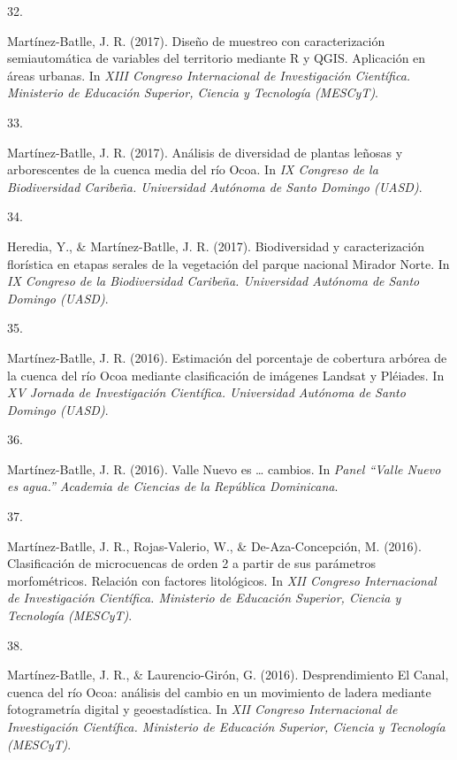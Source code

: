 \documentclass[10pt,a4paper,]{article}
\newlength{\cslhangindent}
\newlength{\csllabelwidth}
\newcommand{\CSLLeftMargin}[1]{\parbox[t]{\csllabelwidth}{\hfill #1~}}
\newcommand{\CSLRightInline}[1]{\parbox[t]{\linewidth - \cslhangindent - \csllabelwidth}{#1}\vspace{0.8ex}}
\begin{document}
\leavevmode\hypertarget{ref-Jose_Ramon_Martinez-Batlle_108008425}{}%
\CSLLeftMargin{32. }
\CSLRightInline{Martínez-Batlle, J. R. (2017). Diseño de muestreo con
caracterización semiautomática de variables del territorio mediante R y
QGIS. Aplicación en áreas urbanas. In \emph{XIII Congreso Internacional
de Investigación Científica. Ministerio de Educación Superior, Ciencia y
Tecnología (MESCyT)}.}

\leavevmode\hypertarget{ref-Jose_Ramon_Martinez-Batlle_108010451}{}%
\CSLLeftMargin{33. }
\CSLRightInline{Martínez-Batlle, J. R. (2017). Análisis de diversidad de
plantas leñosas y arborescentes de la cuenca media del río Ocoa. In
\emph{IX Congreso de la Biodiversidad Caribeña. Universidad Autónoma de
Santo Domingo (UASD)}.}

\leavevmode\hypertarget{ref-Jose_Ramon_Martinez-Batlle_108010431}{}%
\CSLLeftMargin{34. }
\CSLRightInline{Heredia, Y., \& Martínez-Batlle, J. R. (2017).
Biodiversidad y caracterización florística en etapas serales de la
vegetación del parque nacional Mirador Norte. In \emph{IX Congreso de la
Biodiversidad Caribeña. Universidad Autónoma de Santo Domingo (UASD)}.}

\leavevmode\hypertarget{ref-Jose_Ramon_Martinez-Batlle_108104972}{}%
\CSLLeftMargin{35. }
\CSLRightInline{Martínez-Batlle, J. R. (2016). Estimación del porcentaje
de cobertura arbórea de la cuenca del río Ocoa mediante clasificación de
imágenes Landsat y Pléiades. In \emph{XV Jornada de Investigación
Científica. Universidad Autónoma de Santo Domingo (UASD)}.}

\leavevmode\hypertarget{ref-Jose_Ramon_Martinez-Batlle_108095974}{}%
\CSLLeftMargin{36. }
\CSLRightInline{Martínez-Batlle, J. R. (2016). Valle Nuevo es \ldots{}
cambios. In \emph{Panel {``Valle Nuevo es agua.''} Academia de Ciencias
de la República Dominicana}.}

\leavevmode\hypertarget{ref-Jose_Ramon_Martinez-Batlle_108041435}{}%
\CSLLeftMargin{37. }
\CSLRightInline{Martínez-Batlle, J. R., Rojas-Valerio, W., \&
De-Aza-Concepción, M. (2016). Clasificación de microcuencas de orden 2 a
partir de sus parámetros morfométricos. Relación con factores
litológicos. In \emph{XII Congreso Internacional de Investigación
Científica. Ministerio de Educación Superior, Ciencia y Tecnología
(MESCyT)}.}

\leavevmode\hypertarget{ref-Jose_Ramon_Martinez-Batlle_108041097}{}%
\CSLLeftMargin{38. }
\CSLRightInline{Martínez-Batlle, J. R., \& Laurencio-Girón, G. (2016).
Desprendimiento El Canal, cuenca del río Ocoa: análisis del cambio en un
movimiento de ladera mediante fotogrametría digital y geoestadística. In
\emph{XII Congreso Internacional de Investigación Científica. Ministerio
de Educación Superior, Ciencia y Tecnología (MESCyT)}.}
\end{document}
